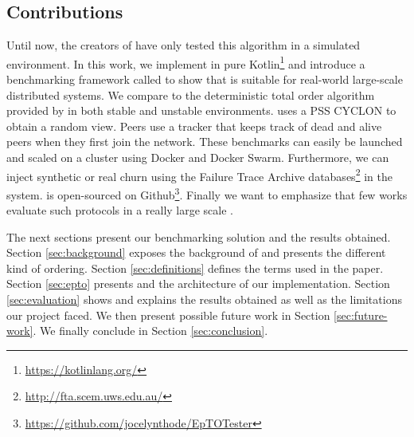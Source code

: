 \subsection{Contributions}
Until now, the creators of \epto have only tested this algorithm in a simulated environment. In this work, we implement \epto in pure Kotlin\footnote{\href{https://kotlinlang.org/}{https://kotlinlang.org/}} and introduce a benchmarking framework called \eptotester to show that \epto is suitable for real-world large-scale distributed systems. We compare \epto to the deterministic total order algorithm provided by \jgroups \autocite{jgroups} in both stable and unstable environments. \epto uses a PSS CYCLON \autocite{Voulgaris2005} to obtain a random view. Peers use a tracker that keeps track of dead and alive peers when they first join the network. These benchmarks can easily be launched and scaled on a cluster using Docker and Docker Swarm. Furthermore, we can inject synthetic or real churn using the Failure Trace Archive databases\footnote{\href{http://fta.scem.uws.edu.au/}{http://fta.scem.uws.edu.au/}} in the system. \eptotester is open-sourced on Github\footnote{\href{https://github.com/jocelynthode/EpTOTester}{https://github.com/jocelynthode/EpTOTester}}. Finally we want to emphasize that few works evaluate such protocols in a really large scale \autocites[]{Chandra2007}[]{Maia2011}.
\par
The next sections present our benchmarking solution and the results obtained. Section \ref{sec:background} exposes the background of \eptotester and presents the different kind of ordering. Section \ref{sec:definitions} defines the terms used in the paper. Section \ref{sec:epto} presents \epto and the architecture of our implementation. Section \ref{sec:evaluation} shows and explains the results obtained as well as the limitations our project faced. We then present possible future work in Section \ref{sec:future-work}. We finally conclude in Section \ref{sec:conclusion}.
